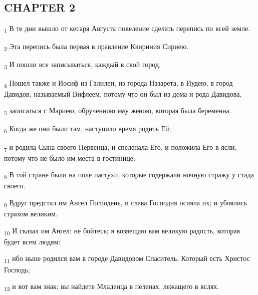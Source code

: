 \subsection{CHAPTER 2}
\begin{tcolorbox}
\textsubscript{1} В те дни вышло от кесаря Августа повеление сделать перепись по всей земле.
\end{tcolorbox}
\begin{tcolorbox}
\textsubscript{2} Эта перепись была первая в правление Квириния Сириею.
\end{tcolorbox}
\begin{tcolorbox}
\textsubscript{3} И пошли все записываться, каждый в свой город.
\end{tcolorbox}
\begin{tcolorbox}
\textsubscript{4} Пошел также и Иосиф из Галилеи, из города Назарета, в Иудею, в город Давидов, называемый Вифлеем, потому что он был из дома и рода Давидова,
\end{tcolorbox}
\begin{tcolorbox}
\textsubscript{5} записаться с Мариею, обрученною ему женою, которая была беременна.
\end{tcolorbox}
\begin{tcolorbox}
\textsubscript{6} Когда же они были там, наступило время родить Ей;
\end{tcolorbox}
\begin{tcolorbox}
\textsubscript{7} и родила Сына своего Первенца, и спеленала Его, и положила Его в ясли, потому что не было им места в гостинице.
\end{tcolorbox}
\begin{tcolorbox}
\textsubscript{8} В той стране были на поле пастухи, которые содержали ночную стражу у стада своего.
\end{tcolorbox}
\begin{tcolorbox}
\textsubscript{9} Вдруг предстал им Ангел Господень, и слава Господня осияла их; и убоялись страхом великим.
\end{tcolorbox}
\begin{tcolorbox}
\textsubscript{10} И сказал им Ангел: не бойтесь; я возвещаю вам великую радость, которая будет всем людям:
\end{tcolorbox}
\begin{tcolorbox}
\textsubscript{11} ибо ныне родился вам в городе Давидовом Спаситель, Который есть Христос Господь;
\end{tcolorbox}
\begin{tcolorbox}
\textsubscript{12} и вот вам знак: вы найдете Младенца в пеленах, лежащего в яслях.
\end{tcolorbox}
